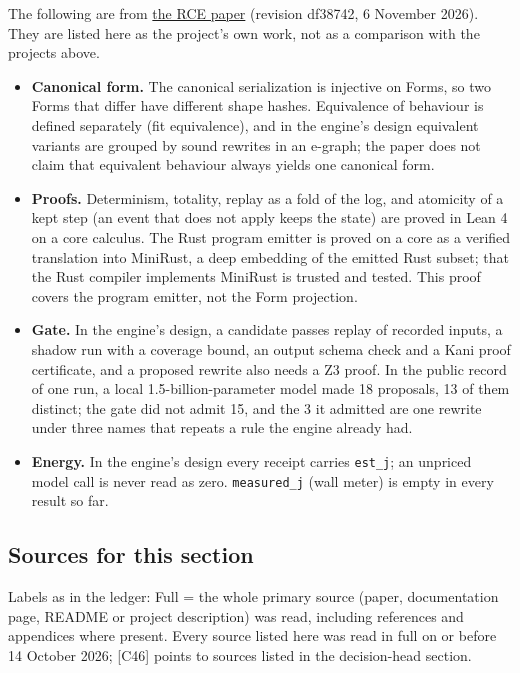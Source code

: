 \documentclass[10pt,letterpaper]{article}
\providecommand{\tightlist}{\setlength{\itemsep}{1pt}\setlength{\parskip}{0pt}}
\begin{document}
The following are from
\href{https://research.openie.dev/papers/rce/}{the RCE paper} (revision
df38742, 6 November 2026). They are listed here as the project's own
work, not as a comparison with the projects above.

\begin{itemize}
\tightlist
\item
  \textbf{Canonical form.} The canonical serialization is injective on
  Forms, so two Forms that differ have different shape hashes.
  Equivalence of behaviour is defined separately (fit equivalence), and
  in the engine's design equivalent variants are grouped by sound
  rewrites in an e-graph; the paper does not claim that equivalent
  behaviour always yields one canonical form.
\item
  \textbf{Proofs.} Determinism, totality, replay as a fold of the log,
  and atomicity of a kept step (an event that does not apply keeps the
  state) are proved in Lean 4 on a core calculus. The Rust program
  emitter is proved on a core as a verified translation into MiniRust, a
  deep embedding of the emitted Rust subset; that the Rust compiler
  implements MiniRust is trusted and tested. This proof covers the
  program emitter, not the Form projection.
\item
  \textbf{Gate.} In the engine's design, a candidate passes replay of
  recorded inputs, a shadow run with a coverage bound, an output schema
  check and a Kani proof certificate, and a proposed rewrite also needs
  a Z3 proof. In the public record of one run, a local
  1.5-billion-parameter model made 18 proposals, 13 of them distinct;
  the gate did not admit 15, and the 3 it admitted are one rewrite under
  three names that repeats a rule the engine already had.
\item
  \textbf{Energy.} In the engine's design every receipt carries
  \texttt{est\_j}; an unpriced model call is never read as zero.
  \texttt{measured\_\allowbreak{}j} (wall meter) is empty in every result so far.
\end{itemize}

\subsection{Sources for this section}\label{sources-for-this-section}

Labels as in the ledger: Full = the whole primary source (paper,
documentation page, README or project description) was read, including
references and appendices where present. Every source listed here was
read in full on or before 14 October 2026; {[}C46{]} points to sources
listed in the decision-head section.
\end{document}

